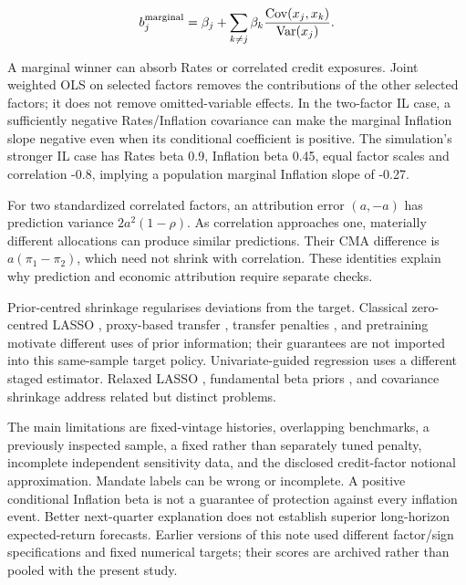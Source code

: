 \documentclass[a4paper,review]{cas-sc}
\begin{document}
\begin{equation}
b_j^{\rm marginal}=\beta_j+\sum_{k\ne j}\beta_k\frac{\operatorname{Cov}(x_j,x_k)}{\operatorname{Var}(x_j)}.
\end{equation}

A marginal winner can absorb Rates or correlated credit exposures. Joint weighted OLS on selected factors removes the contributions of the other selected factors; it does not remove omitted-variable effects. In the two-factor IL case, a sufficiently negative Rates/Inflation covariance can make the marginal Inflation slope negative even when its conditional coefficient is positive. The simulation's stronger IL case has Rates beta 0.9, Inflation beta 0.45, equal factor scales and correlation -0.8, implying a population marginal Inflation slope of -0.27.

For two standardized correlated factors, an attribution error $(a,-a)$ has prediction variance $2a^2(1-\rho)$. As correlation approaches one, materially different allocations can produce similar predictions. Their CMA difference is $a(\pi_1-\pi_2)$, which need not shrink with correlation. These identities explain why prediction and economic attribution require separate checks.

Prior-centred shrinkage regularises deviations from the target. Classical zero-centred LASSO \citep{tibshirani1996}, proxy-based transfer \citep{bastani2021}, transfer penalties \citep{takada2020}, and pretraining \citep{craig2026} motivate different uses of prior information; their guarantees are not imported into this same-sample target policy. Univariate-guided regression \citep{chatterjee2025} uses a different staged estimator. Relaxed LASSO \citep{meinshausen2007}, fundamental beta priors \citep{cosemans2016}, and covariance shrinkage \citep{ledoit2003} address related but distinct problems.

The main limitations are fixed-vintage histories, overlapping benchmarks, a previously inspected sample, a fixed rather than separately tuned penalty, incomplete independent sensitivity data, and the disclosed credit-factor notional approximation. Mandate labels can be wrong or incomplete. A positive conditional Inflation beta is not a guarantee of protection against every inflation event. Better next-quarter explanation does not establish superior long-horizon expected-return forecasts. Earlier versions of this note used different factor/sign specifications and fixed numerical targets; their scores are archived rather than pooled with the present study.
\end{document}
